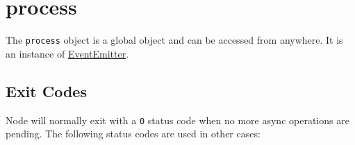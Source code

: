 \section{process}\label{process}

The \texttt{process} object is a global object and can be accessed from
anywhere. It is an instance of
\href{events.html\#events_class_events_eventemitter}{EventEmitter}.

\subsection{Exit Codes}\label{exit-codes}

Node will normally exit with a \texttt{0} status code when no more async
operations are pending. The following status codes are used in other
cases:

